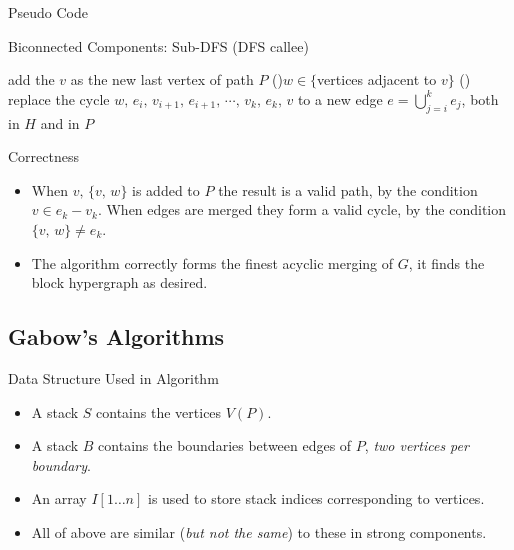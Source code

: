 \documentclass{beamer}
\begin{document}
\begin{frame}{Pseudo Code}
	\SetAlFnt{\small}
	\begin{algorithm}[H]
		\caption{Biconnected Components: Sub-DFS (DFS callee)}
		add the $v$ as the new last vertex of path $P$\;
		\For(){$w\in \{$vertices adjacent to $v\}$}{
			\Else(){
				replace the cycle $w,\,e_i,\,v_{i+1},\,e_{i+1},\,\cdots,\,v_k,\,e_k,\,v$
				to a new edge $e=\bigcup_{j=i}^ke_j$, both in $H$ and in $P$\;
			}
		}
	\end{algorithm}
\end{frame}

\begin{frame}{Correctness}
	\begin{itemize}
		\item
		When $v,\,\{v,\,w\}$ is added to $P$ the result is a valid path, by the
		condition $v\in e_k-v_k$. When edges are merged they form a valid cycle,
		by the condition $\{v,\,w\}\neq e_k$.
		\item
		The algorithm correctly forms the finest acyclic merging of $G$, it finds
		the block hypergraph as desired.
	\end{itemize}
\end{frame}

\subsection{Gabow's Algorithms}

\begin{frame}{Data Structure Used in Algorithm}
	\begin{itemize}
		\item
		A \alert{stack $S$} contains the vertices $V(P)$.
		\item
		A \alert{stack $B$} contains the boundaries between edges of $P$, \emph{two vertices per boundary}.
		\item
		An array \alert{$I[1\ldots n]$} is used to store stack indices corresponding to vertices.
		\item
		All of above are similar (\emph{but not the same}) to these in strong components.
	\end{itemize}
\end{frame}
\end{document}
